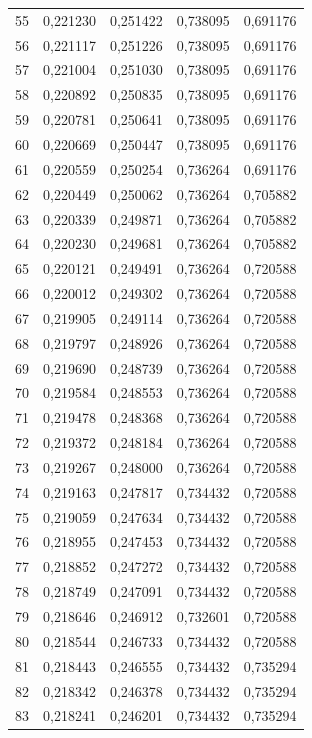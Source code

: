 \begin{tabular}{lrrrr}
55 & 0,221230 & 0,251422 & 0,738095 & 0,691176 \\
56 & 0,221117 & 0,251226 & 0,738095 & 0,691176 \\
57 & 0,221004 & 0,251030 & 0,738095 & 0,691176 \\
58 & 0,220892 & 0,250835 & 0,738095 & 0,691176 \\
59 & 0,220781 & 0,250641 & 0,738095 & 0,691176 \\
60 & 0,220669 & 0,250447 & 0,738095 & 0,691176 \\
61 & 0,220559 & 0,250254 & 0,736264 & 0,691176 \\
62 & 0,220449 & 0,250062 & 0,736264 & 0,705882 \\
63 & 0,220339 & 0,249871 & 0,736264 & 0,705882 \\
64 & 0,220230 & 0,249681 & 0,736264 & 0,705882 \\
65 & 0,220121 & 0,249491 & 0,736264 & 0,720588 \\
66 & 0,220012 & 0,249302 & 0,736264 & 0,720588 \\
67 & 0,219905 & 0,249114 & 0,736264 & 0,720588 \\
68 & 0,219797 & 0,248926 & 0,736264 & 0,720588 \\
69 & 0,219690 & 0,248739 & 0,736264 & 0,720588 \\
70 & 0,219584 & 0,248553 & 0,736264 & 0,720588 \\
71 & 0,219478 & 0,248368 & 0,736264 & 0,720588 \\
72 & 0,219372 & 0,248184 & 0,736264 & 0,720588 \\
73 & 0,219267 & 0,248000 & 0,736264 & 0,720588 \\
74 & 0,219163 & 0,247817 & 0,734432 & 0,720588 \\
75 & 0,219059 & 0,247634 & 0,734432 & 0,720588 \\
76 & 0,218955 & 0,247453 & 0,734432 & 0,720588 \\
77 & 0,218852 & 0,247272 & 0,734432 & 0,720588 \\
78 & 0,218749 & 0,247091 & 0,734432 & 0,720588 \\
79 & 0,218646 & 0,246912 & 0,732601 & 0,720588 \\
80 & 0,218544 & 0,246733 & 0,734432 & 0,720588 \\
81 & 0,218443 & 0,246555 & 0,734432 & 0,735294 \\
82 & 0,218342 & 0,246378 & 0,734432 & 0,735294 \\
83 & 0,218241 & 0,246201 & 0,734432 & 0,735294 \\

\end{tabular}
